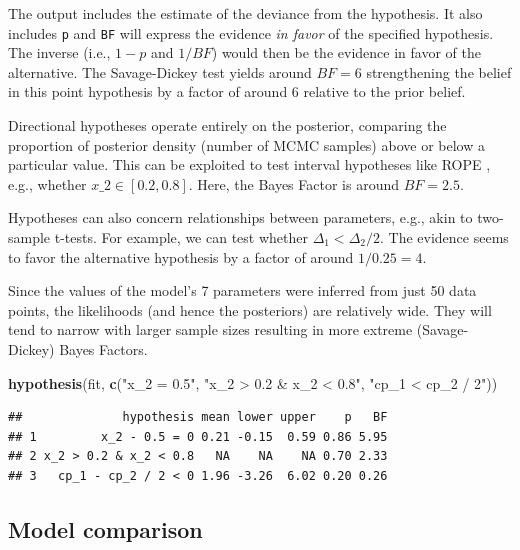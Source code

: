 \documentclass[
  american,
]{article}
\newenvironment{Shaded}{\begin{snugshade}}{\end{snugshade}}
\newcommand{\KeywordTok}[1]{\textcolor[rgb]{0.13,0.29,0.53}{\textbf{#1}}}
\newcommand{\NormalTok}[1]{#1}
\newcommand{\StringTok}[1]{\textcolor[rgb]{0.31,0.60,0.02}{#1}}
\begin{document}
The output includes the estimate of the deviance from the hypothesis. It also includes \texttt{p} and \texttt{BF} will express the evidence \emph{in favor} of the specified hypothesis. The inverse (i.e., \(1 - p\) and \(1 / BF\)) would then be the evidence in favor of the alternative. The Savage-Dickey test yields around \(BF = 6\) strengthening the belief in this point hypothesis by a factor of around 6 relative to the prior belief.

Directional hypotheses operate entirely on the posterior, comparing the proportion of posterior density (number of MCMC samples) above or below a particular value. This can be exploited to test interval hypotheses like ROPE \citep{kruschke2011}, e.g., whether \(x\_2 \in [0.2, 0.8]\). Here, the Bayes Factor is around \(BF = 2.5\).

Hypotheses can also concern relationships between parameters, e.g., akin to two-sample t-tests. For example, we can test whether \(\Delta_1 < \Delta_2 / 2\). The evidence seems to favor the alternative hypothesis by a factor of around \(1 / 0.25 = 4\).

Since the values of the model's 7 parameters were inferred from just 50 data points, the likelihoods (and hence the posteriors) are relatively wide. They will tend to narrow with larger sample sizes resulting in more extreme (Savage-Dickey) Bayes Factors.

\begin{Shaded}
\begin{Highlighting}[]
\KeywordTok{hypothesis}\NormalTok{(fit, }\KeywordTok{c}\NormalTok{(}\StringTok{"x_2 = 0.5"}\NormalTok{, }
                  \StringTok{"x_2 > 0.2 & x_2 < 0.8"}\NormalTok{,}
                  \StringTok{"cp_1 < cp_2 / 2"}\NormalTok{))}
\end{Highlighting}
\end{Shaded}

\begin{verbatim}
##              hypothesis mean lower upper    p   BF
## 1         x_2 - 0.5 = 0 0.21 -0.15  0.59 0.86 5.95
## 2 x_2 > 0.2 & x_2 < 0.8   NA    NA    NA 0.70 2.33
## 3   cp_1 - cp_2 / 2 < 0 1.96 -3.26  6.02 0.20 0.26
\end{verbatim}

\hypertarget{model-comparison}{%
\subsection{Model comparison}\label{model-comparison}}
\end{document}
